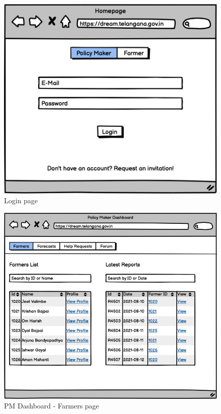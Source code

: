 \documentclass[10pt]{article}
\begin{document}
\begin{figure}[ht!]
    \centering
    \includegraphics[scale=0.45]{ui/login.png}
    \caption{Login page}
\end{figure}
\begin{figure}[ht!]
    \centering
    \includegraphics[scale=0.30]{ui/pm_farmers.png}
    \caption{PM Dashboard - Farmers page}
\end{figure}
\end{document}
